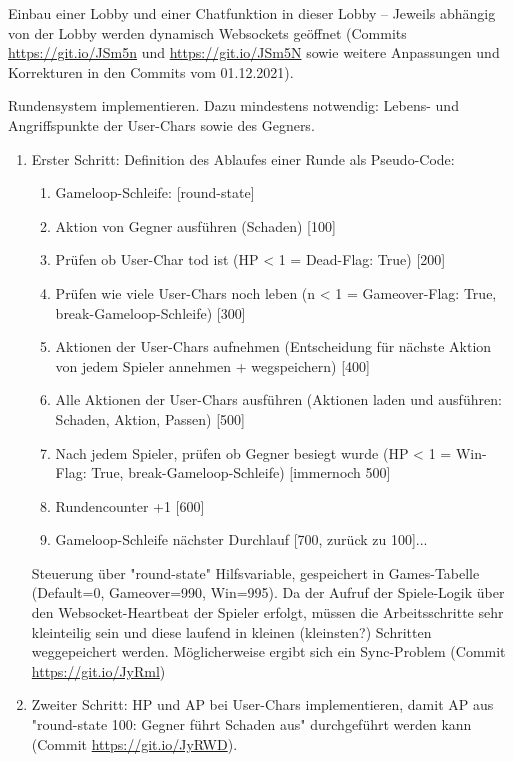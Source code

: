 Einbau einer Lobby und einer Chatfunktion in dieser Lobby -- Jeweils abhängig von der Lobby werden dynamisch Websockets geöffnet (Commits \url{https://git.io/JSm5n} und \url{https://git.io/JSm5N} sowie weitere Anpassungen und Korrekturen in den Commits vom 01.12.2021).


Rundensystem implementieren. Dazu mindestens notwendig: Lebens- und Angriffspunkte der User-Chars sowie des Gegners. 
    \begin{enumerate}
        \item Erster Schritt: Definition des Ablaufes einer Runde als Pseudo-Code: 
            \begin{enumerate}
                \item Gameloop-Schleife: [round-state]
                \item Aktion von Gegner ausführen (Schaden) [100]
                \item Prüfen ob User-Char tod ist (HP < 1 = Dead-Flag: True) [200]
                \item Prüfen wie viele User-Chars noch leben (n < 1 = Gameover-Flag: True, break-Gameloop-Schleife) [300]
                \item Aktionen der User-Chars aufnehmen (Entscheidung für nächste Aktion von jedem Spieler annehmen + wegspeichern) [400]
                \item Alle Aktionen der User-Chars ausführen (Aktionen laden und ausführen: Schaden, Aktion, Passen) [500]
                \item Nach jedem Spieler, prüfen ob Gegner besiegt wurde (HP < 1 = Win-Flag: True, break-Gameloop-Schleife) [immernoch 500]
                \item Rundencounter +1 [600]
                \item Gameloop-Schleife nächster Durchlauf [700, zurück zu 100]...
            \end{enumerate}
    Steuerung über "round-state" Hilfsvariable, gespeichert in Games-Tabelle (Default=0, Gameover=990, Win=995). Da der Aufruf der Spiele-Logik über den Websocket-Heartbeat der Spieler erfolgt, müssen die Arbeitsschritte sehr kleinteilig sein und diese laufend in kleinen (kleinsten?) Schritten weggepeichert werden. Möglicherweise ergibt sich ein Sync-Problem (Commit \url{https://git.io/JyRml})
    \item Zweiter Schritt: HP und AP bei User-Chars implementieren, damit AP aus "round-state 100: Gegner führt Schaden aus" durchgeführt werden kann (Commit \url{https://git.io/JyRWD}).  
    \end{enumerate}








